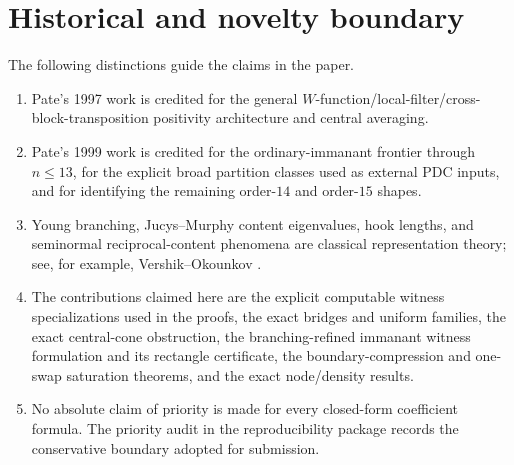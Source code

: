 \documentclass[11pt]{article}
\theoremstyle{definition}
\begin{document}
\section{Historical and novelty boundary}
The following distinctions guide the claims in the paper.
\begin{enumerate}[label=(\roman*)]
\item Pate's 1997 work is credited for the general $W$-function/local-filter/cross-block-transposition positivity architecture and central averaging.
\item Pate's 1999 work is credited for the ordinary-immanant frontier through $n\le13$, for the explicit broad partition classes used as external PDC inputs, and for identifying the remaining order-$14$ and order-$15$ shapes.
\item Young branching, Jucys--Murphy content eigenvalues, hook lengths, and seminormal reciprocal-content phenomena are classical representation theory; see, for example, Vershik--Okounkov \cite{VershikOkounkov2005}.
\item The contributions claimed here are the explicit computable witness specializations used in the proofs, the exact bridges and uniform families, the exact central-cone obstruction, the branching-refined immanant witness formulation and its rectangle certificate, the boundary-compression and one-swap saturation theorems, and the exact node/density results.
\item No absolute claim of priority is made for every closed-form coefficient formula.  The priority audit in the reproducibility package records the conservative boundary adopted for submission.
\end{enumerate}



\end{document}
